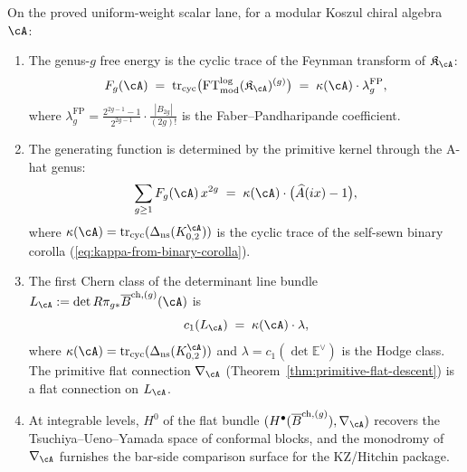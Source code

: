 \begin{theorem}
\label{thm:conformal-block-reconstruction}
On the proved uniform-weight scalar lane, for a modular Koszul
chiral algebra $\cA$:
\begin{enumerate}[label=\textup{(\roman*)}]
\item The genus-$g$ free energy is the cyclic trace of the
  Feynman transform of $\mathfrak{K}_\cA$:
  \begin{equation}
  \label{eq:free-energy-from-kernel}
  F_g(\cA)
  \;=\;
  \operatorname{tr}_{\mathrm{cyc}}\bigl(
  \operatorname{FT}^{\log}_{\mathrm{mod}}(\mathfrak{K}_\cA)^{(g)}
  \bigr)
  \;=\;
  \kappa(\cA) \cdot \lambda_g^{\mathrm{FP}},
  \end{equation}
  where $\lambda_g^{\mathrm{FP}} =
  \frac{2^{2g-1}-1}{2^{2g-1}} \cdot
  \frac{|B_{2g}|}{(2g)!}$ is the
  Faber--Pandharipande coefficient.
\item The generating function is determined by the primitive
  kernel through the A-hat genus:
  \begin{equation}
  \label{eq:generating-from-kernel}
  \sum_{g \geq 1} F_g(\cA)\, x^{2g}
  \;=\;
  \kappa(\cA) \cdot
  \bigl(\widehat{A}(ix) - 1\bigr),
  \end{equation}
  where $\kappa(\cA) =
  \operatorname{tr}_{\mathrm{cyc}}(\Delta_{\mathrm{ns}}(K_{0,2}^\cA))$
  is the cyclic trace of the self-sewn binary corolla
  \textup{(}\eqref{eq:kappa-from-binary-corolla}\textup{)}.
\item The first Chern class of the determinant line bundle
  $L_\cA := \det R\pi_{g*}\overline{B}^{\mathrm{ch},(g)}(\cA)$ is
  \begin{equation}
  \label{eq:det-line-from-kernel}
  c_1(L_\cA)
  \;=\;
  \kappa(\cA) \cdot \lambda,
  \end{equation}
  where $\kappa(\cA) =
  \operatorname{tr}_{\mathrm{cyc}}(\Delta_{\mathrm{ns}}(K_{0,2}^\cA))$
  and $\lambda = c_1(\det \mathbb{E}^\vee)$ is the Hodge class.
  The primitive flat connection
  $\nabla_\cA$
  \textup{(}Theorem~\textup{\ref{thm:primitive-flat-descent})}
  is a flat connection on $L_\cA$.
\item At integrable levels, $H^0$ of the flat bundle
  $(H^\bullet(\overline{B}^{\mathrm{ch},(g)}), \nabla_\cA)$ recovers the
  Tsuchiya--Ueno--Yamada space of conformal blocks,
  and the monodromy of $\nabla_\cA$ furnishes the
  bar-side comparison surface for the KZ/Hitchin package.
\end{enumerate}
\end{theorem}

